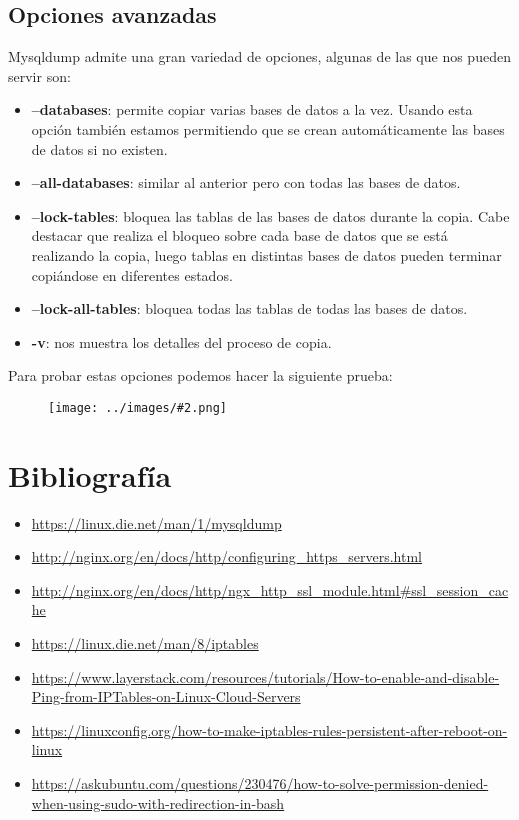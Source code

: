 \documentclass[twoside]{article}
\newcommand{\image}[2]{
\begin{figure}[H]
    \texttt{[image: ../images/\#2.png]}
    \centering
\end{figure}
}
\begin{document}
\subsection{Opciones avanzadas}
Mysqldump admite una gran variedad de opciones, algunas de las que nos pueden servir son:
\begin{itemize}
    \item \textbf{--databases}: permite copiar varias bases de datos a la vez. Usando esta opción también estamos permitiendo que se crean automáticamente las bases de datos si no existen.
    \item \textbf{--all-databases}: similar al anterior pero con todas las bases de datos.
    \item \textbf{--lock-tables}: bloquea las tablas de las bases de datos durante la copia. Cabe destacar que realiza el bloqueo sobre cada base de datos que se está realizando la copia, luego tablas en distintas bases de datos pueden terminar copiándose en diferentes estados.
    \item \textbf{--lock-all-tables}: bloquea todas las tablas de todas las bases de datos.
    \item \textbf{-v}: nos muestra los detalles del proceso de copia.
\end{itemize}
Para probar estas opciones podemos hacer la siguiente prueba:
\image{10}{13}



\newpage
\section{Bibliografía}
\begin{itemize}
    \item \url{https://linux.die.net/man/1/mysqldump}
    
    
    \item \url{http://nginx.org/en/docs/http/configuring_https_servers.html}
    \item \url{http://nginx.org/en/docs/http/ngx_http_ssl_module.html#ssl_session_cache}
    \item \url{https://linux.die.net/man/8/iptables}
    \item \url{https://www.layerstack.com/resources/tutorials/How-to-enable-and-disable-Ping-from-IPTables-on-Linux-Cloud-Servers}
    \item \url{https://linuxconfig.org/how-to-make-iptables-rules-persistent-after-reboot-on-linux}
    \item \url{https://askubuntu.com/questions/230476/how-to-solve-permission-denied-when-using-sudo-with-redirection-in-bash}
\end{itemize}
\end{document}
